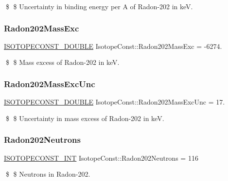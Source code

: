 \$ \$ Uncertainty in binding energy per A of Radon-\/202 in keV. \mbox{\label{group___isotope_const-_radon-_rn202_ga9697b619aef66be2f8c222b919bd3a14}} 
\subsubsection{\texorpdfstring{Radon202\+Mass\+Exc}{Radon202MassExc}}
{\footnotesize\ttfamily \mbox{\hyperlink{group___isotope_const-_macros_ga8f45a7272ce02c0b4c65c44636ed719a}{I\+S\+O\+T\+O\+P\+E\+C\+O\+N\+S\+T\+\_\+\+D\+O\+U\+B\+LE}} Isotope\+Const\+::\+Radon202\+Mass\+Exc = -\/6274.}

\$ \$ Mass excess of Radon-\/202 in keV. \mbox{\label{group___isotope_const-_radon-_rn202_ga31b2f8f31e3a58f99af1617bf737bda0}} 
\subsubsection{\texorpdfstring{Radon202\+Mass\+Exc\+Unc}{Radon202MassExcUnc}}
{\footnotesize\ttfamily \mbox{\hyperlink{group___isotope_const-_macros_ga8f45a7272ce02c0b4c65c44636ed719a}{I\+S\+O\+T\+O\+P\+E\+C\+O\+N\+S\+T\+\_\+\+D\+O\+U\+B\+LE}} Isotope\+Const\+::\+Radon202\+Mass\+Exc\+Unc = 17.}

\$ \$ Uncertainty in mass excess of Radon-\/202 in keV. \mbox{\label{group___isotope_const-_radon-_rn202_gad10f55bd4344feee35dd901b156d3aeb}} 
\subsubsection{\texorpdfstring{Radon202\+Neutrons}{Radon202Neutrons}}
{\footnotesize\ttfamily \mbox{\hyperlink{group___isotope_const-_macros_ga5f18360b3e99483a35c32d789e62621c}{I\+S\+O\+T\+O\+P\+E\+C\+O\+N\+S\+T\+\_\+\+I\+NT}} Isotope\+Const\+::\+Radon202\+Neutrons = 116}

\$ \$ Neutrons in Radon-\/202. \mbox{\label{group___isotope_const-_radon-_rn202_gab3a114bab5e88106f3196bbb3f1d70f9}} 

